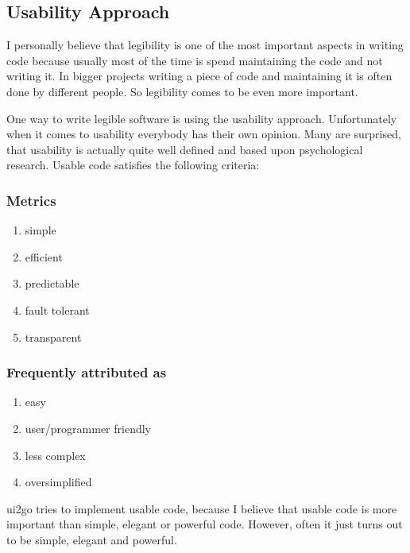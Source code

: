 \subsection{Usability Approach}

I personally believe that legibility is one of the most important
aspects in writing code because usually most of the time is spend
maintaining the code and not writing it. In bigger projects writing a
piece of code and maintaining it is often done by different people. So
legibility comes to be even more important.

One way to write legible software is using the usability approach.
Unfortunately when it comes to usability everybody has their own
opinion. Many are surprised, that usability is actually quite well
defined and based upon psychological research. Usable code satisfies the
following criteria:

\subsubsection{Metrics}

\begin{enumerate}
\item
  simple
\item
  efficient
\item
  predictable
\item
  fault tolerant
\item
  transparent
\end{enumerate}

\subsubsection{Frequently attributed as}

\begin{enumerate}
\item
  easy
\item
  user/programmer friendly
\item
  less complex
\item
  oversimplified
\end{enumerate}

ui2go tries to implement usable code, because I believe that usable code
is more important than simple, elegant or powerful code. However, often
it just turns out to be simple, elegant and powerful.

